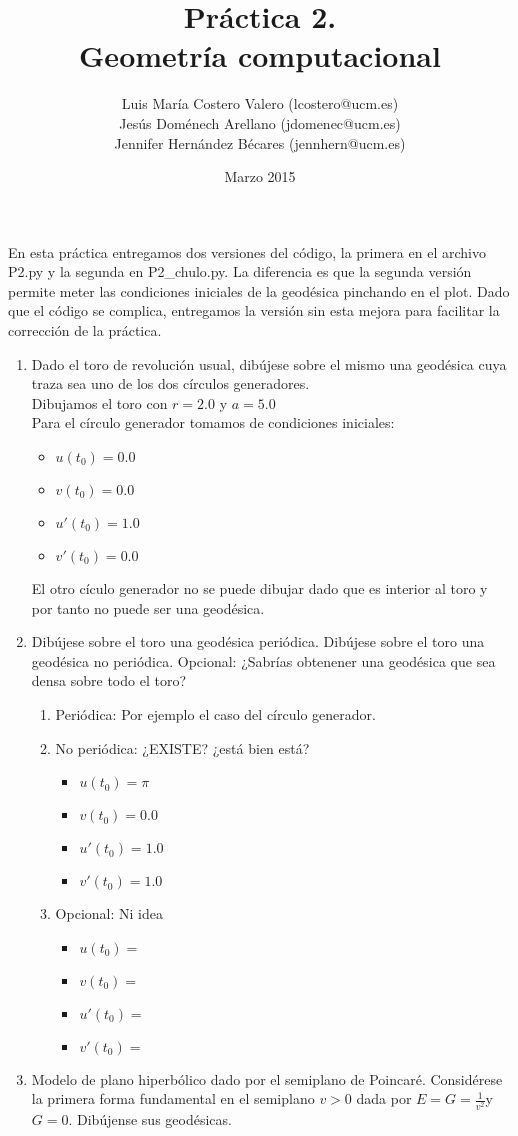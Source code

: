\documentclass[12pt,a4paper]{article}
\title{Práctica 2. \\ Geometría computacional}
\author{Luis María Costero Valero (lcostero@ucm.es)\\ Jesús Doménech
  Arellano (jdomenec@ucm.es) \\ Jennifer Hernández Bécares (jennhern@ucm.es)}
\date{Marzo 2015}
\begin{document}
\maketitle
\doublespace
En esta práctica entregamos dos versiones del código, la primera en el
archivo P2.py y la segunda en P2\_chulo.py. La diferencia es que la
segunda versión permite meter las condiciones iniciales de la
geodésica pinchando en el plot. Dado que el código se complica,
entregamos la versión sin esta mejora para facilitar la corrección de
la práctica.
\begin{enumerate}
\item Dado el toro de revolución usual, dibújese sobre el mismo una
  geodésica cuya traza sea uno de los dos círculos generadores.\\
  Dibujamos el toro con $r = 2.0$ y $a = 5.0$ \\
  Para el círculo generador tomamos de condiciones iniciales:\\
  \begin{itemize}
    \item $u(t_0) = 0.0$
    \item $v(t_0) = 0.0$
    \item $u'(t_0) = 1.0$
    \item $v'(t_0) = 0.0$
  \end{itemize}
  El otro cículo generador no se puede dibujar dado que es interior al
  toro y por tanto no puede ser una geodésica.
\item Dibújese sobre el toro una geodésica periódica. Dibújese sobre
  el toro una geodésica no periódica. Opcional: ¿Sabrías obtenener una
  geodésica que sea densa sobre todo el toro?
  \begin{enumerate}
  \item Periódica: Por ejemplo el caso del círculo generador.
  \item No periódica: ¿EXISTE? ¿está bien está?
    \begin{itemize}
    \item $u(t_0) = \pi$
    \item $v(t_0) = 0.0$
    \item $u'(t_0) = 1.0$
    \item $v'(t_0) = 1.0$
    \end{itemize}
  \item Opcional: Ni idea
    \begin{itemize}
    \item $u(t_0) = $
    \item $v(t_0) = $
    \item $u'(t_0) = $
    \item $v'(t_0) = $
    \end{itemize}
  \end{enumerate}
\item Modelo de plano hiperbólico dado por el semiplano de
  Poincaré. Considérese la primera forma fundamental en el semiplano
  $v>0$ dada por $E = G = \frac{1}{v^{2}}$y$G = 0$. Dibújense sus
  geodésicas. 
\end{enumerate}
\end{document}
